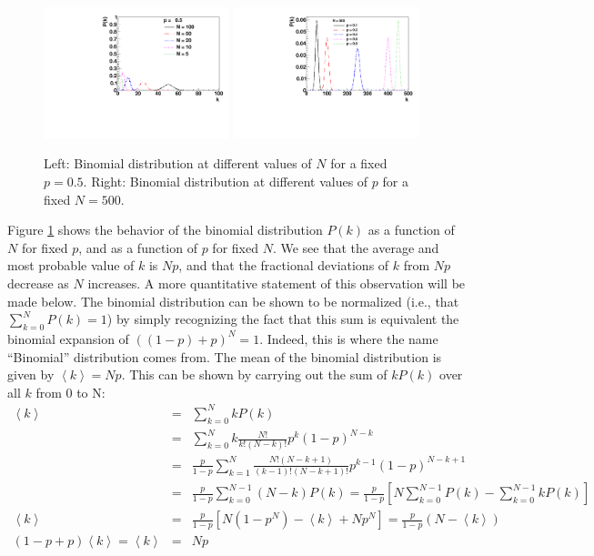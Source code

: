 \documentclass{revtex4}
\begin{document}
\begin{figure}[h]
  \begin{center}
    \includegraphics[width=0.48\textwidth]{Binomial_vs_N_p50.pdf}
    \includegraphics[width=0.48\textwidth]{Binomial_vs_p_N500.pdf}
  \end{center}
  \caption{\label{fig:binomial} Left: Binomial distribution at
    different values of $N$ for a fixed $p=0.5$. Right: Binomial
    distribution at different values of $p$ for a fixed $N = 500$.}
\end{figure}
Figure \ref{fig:binomial} shows the behavior of the binomial
distribution $P(k)$ as a function of $N$ for fixed $p$, and as a
function of $p$ for fixed $N$. We see that the average and most
probable value of $k$ is $Np$, and that the fractional deviations of
$k$ from $Np$ decrease as $N$ increases. A more quantitative statement
of this observation will be made below. The binomial distribution can be shown to be normalized (i.e., that
$\sum_{k=0}^N P(k) = 1$) by simply recognizing the fact that this sum
is equivalent the binomial expansion of $((1-p)+p)^N = 1$. Indeed,
this is where the name ``Binomial'' distribution comes from. The mean of the binomial distribution is given by $\left<k\right> =
Np$. This can be shown by carrying out the sum of $k P(k)$ over all
$k$ from 0 to N:
\begin{eqnarray}
  \left<k\right> &=& \sum_{k=0}^N k P(k) \nonumber \\
  &=& \sum_{k=0}^N k \frac{N!}{k! (N-k)!} p^k (1-p)^{N-k} \nonumber \\
  &=& \frac{p}{1-p} \sum_{k=1}^N \frac{N!(N-k+1)}{(k-1)! (N-k+1)!} p^{k-1}(1-p)^{N-k+1} \nonumber \\
  &=& \frac{p}{1-p} \sum_{k=0}^{N-1} (N-k) P(k) = \frac{p}{1-p}
  \left[N\sum_{k=0}^{N-1} P(k) - \sum_{k=0}^{N-1} k P(k)\right]
  \nonumber \\
  \left<k\right> &=& \frac{p}{1-p}\left[N(1-p^N) - \left<k\right> + N p^N \right] =
  \frac{p}{1-p}(N-\left<k\right>) \nonumber \\
  \left(1-p+p\right)\left<k\right> = \left<k\right> &=& Np \label{binomial_mean}
\end{eqnarray}
\end{document}
